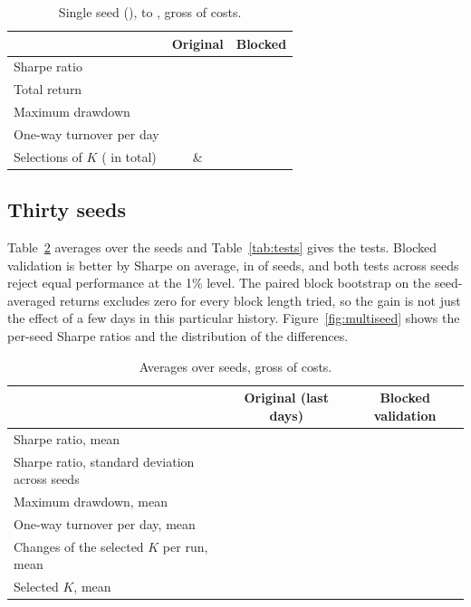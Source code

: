 \documentclass[11pt]{article}
\begin{document}
\begin{table}[H]
\centering
\caption{Single seed (\SingleSeed{}), \OOSStart{} to \OOSEnd{}, gross of costs.}
\label{tab:single}
\begin{tabular}{lcc}
\toprule
 & Original & Blocked \\
\midrule
Sharpe ratio & \OneBaseSharpe{} & \OneBlkSharpe{} \\
Total return & \OneBaseReturn{} & \OneBlkReturn{} \\
Maximum drawdown & \OneBaseMaxDD{} & \OneBlkMaxDD{} \\
One-way turnover per day & \OneBaseTurnover{} & \OneBlkTurnover{} \\
Selections of $K$ (\OneBaseNSelections{} in total) & \parbox[t]{0.24\linewidth}{\centering\OneBaseKCounts{}} & \parbox[t]{0.24\linewidth}{\centering\OneBlkKCounts{}} \\
\bottomrule
\end{tabular}
\end{table}

\subsection{Thirty seeds}

Table~\ref{tab:multi} averages over the \NSeeds{} seeds and Table~\ref{tab:tests} gives the tests. Blocked validation is better by \DSharpeMean{} Sharpe on average, in \SeedsBetter{} of \NSeeds{} seeds, and both tests across seeds reject equal performance at the 1\% level. The paired block bootstrap on the seed-averaged returns excludes zero for every block length tried, so the gain is not just the effect of a few days in this particular history. Figure~\ref{fig:multiseed} shows the per-seed Sharpe ratios and the distribution of the differences.

\begin{table}[H]
\centering
\caption{Averages over \NSeeds{} seeds, gross of costs.}
\label{tab:multi}
\begin{tabular}{lcc}
\toprule
 & Original (last \ValidationDays{} days) & Blocked validation \\
\midrule
Sharpe ratio, mean & \SeedBaseSharpe{} & \SeedBlkSharpe{} \\
Sharpe ratio, standard deviation across seeds & \SeedBaseSharpeSD{} & \SeedBlkSharpeSD{} \\
Maximum drawdown, mean & \SeedBaseMaxDD{} & \SeedBlkMaxDD{} \\
One-way turnover per day, mean & \SeedBaseTurnover{} & \SeedBlkTurnover{} \\
Changes of the selected $K$ per run, mean & \SeedBaseSwitches{} & \SeedBlkSwitches{} \\
Selected $K$, mean & \SeedBaseMeanK{} & \SeedBlkMeanK{} \\
\bottomrule
\end{tabular}
\end{table}
\end{document}
